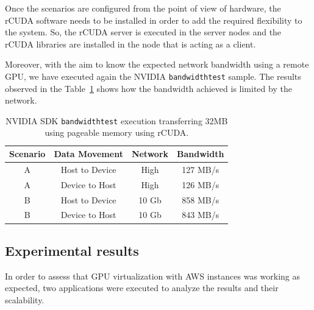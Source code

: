 \documentclass[a4paper,twoside]{article}
\begin{document}
Once the scenarios are configured from the point of view of hardware, 
the {rCUDA} software needs to be installed in order to add 
the required flexibility to the system. So, the {rCUDA} server is 
executed in the server nodes and the {rCUDA} libraries are installed 
in the node that is acting as a client.

Moreover, with the aim to know the expected network bandwidth using 
a remote GPU, we have executed again the NVIDIA {\tt bandwidthtest} sample.
The results observed in the Table~\ref{table:bwtrcuda} shows how the bandwidth achieved is limited 
by the network.

\begin{table}[htb]
\renewcommand{\arraystretch}{1.3}
\caption{NVIDIA SDK {\tt bandwidthtest} execution transferring 32MB using pageable memory using {rCUDA}.}
\label{table:bwtrcuda}
\tabcolsep=0.09cm
\begin{center}\begin{tabular}{cccc}
Scenario &  Data Movement & Network & Bandwidth \\ \hline \hline
A & Host to Device & High& 127 MB/s \\ \hline
A & Device to Host & High& 126 MB/s\\ \hline
B & Host to Device & 10 Gb& 858 MB/s\\ \hline
B & Device to Host & 10 Gb& 843 MB/s\\ \hline
\end{tabular}\end{center}\end{table}

\subsection{Experimental results}
In order to assess that GPU virtualization with AWS instances was working as expected, two applications were executed to analyze the results and their scalability.
\end{document}
